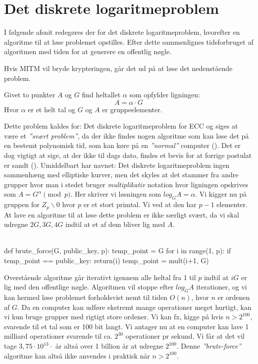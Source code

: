 \section{Det diskrete logaritmeproblem}
I følgende afsnit redegøres der for det diskrete logaritmeproblem, hvorefter en algoritme til at løse problemet opstilles. Efter dette sammenlignes tidsforbruget af algoritmen med tiden for at generere en offentlig nøgle. 

Hvis MITM vil bryde krypteringen, går det ud på at løse det nedenstående problem.
\begin{mdframed}[frametitle={Det diskrete logaritmeproblem for elliptiske kurver}]
Givet to punkter $A$ og $G$ find heltallet $\alpha$ som opfylder ligningen:
\begin{equation}
    A=\alpha \cdot G
\end{equation}
Hvor $\alpha$ er et helt tal og $G$ og $A$ er gruppeelementer.
\end{mdframed}

Dette problem kaldes for: Det diskrete logaritmeproblem for ECC og siges at være et \textit{”svært problem”}, da der ikke findes nogen algoritme som kan løse det på en bestemt polynomisk tid, som kan køre på en \textit{”normal”} computer (\cite{youssefelhousni2018}). Det er dog vigtigt at sige, at der ikke til dags dato, findes et bevis for at forrige postulat er sandt (\cite{timsroberts}). Umiddelbart har navnet: Det diskrete logaritmeproblem ingen sammenhæng med elliptiske kurver, men det skyles at det stammer fra andre grupper hvor man i stedet bruger \textit{multiplikativ} notation hvor ligningen opskrives som $A=G^\alpha  \pmod{p}$. Her skriver vi løsningen  som $log_{G}A=\alpha$. Vi kigger nu på gruppen for $Z_p \backslash {0}$ hvor $p$ er et stort primtal. Vi ved at den har $p-1$ elementer. At lave en algoritme til at løse dette problem er ikke særligt svært, da vi skal udregne $2G, 3G, 4G$ indtil at et af dem bliver lig med $A$.
\\\\
\begin{python}
	def brute_force(G, public_key, p):
		temp_point = G
		for i in range(1, p):
			if temp_point == public_key:
				return(i)
			temp_point = mult(i+1, G)
\end{python}
Overstående algoritme går iterativt igennem alle heltal fra 1 til $p$ indtil at $iG$ er lig med den offentlige nøgle.
Algoritmen vil stoppe efter $log_{G}A$ iterationer, og vi kan hermed løse problemet forholdsvist nemt til tiden $O(n)$, hvor $n$ er ordenen af $G$. Da en computer kan udføre ekstremt mange operationer meget hurtigt, kan vi kun bruge grupper med rigtigt store ordener. Vi kan fx, kigge på hvis $n > 2^{100}$, svarende til et tal som er 100 bit langt. Vi antager nu at en computer kan lave 1 milliard operationer svarende til ca. $2^{30}$ operationer pr sekund. Vi får at det vil tage $3,75\cdot 10^{13}\cdot$ år altså over 1 billion år at udregne $2^{100}$. Denne \textit{”brute-force”} algoritme kan altså ikke anvendes i praktisk når $n > 2^{100}$.


